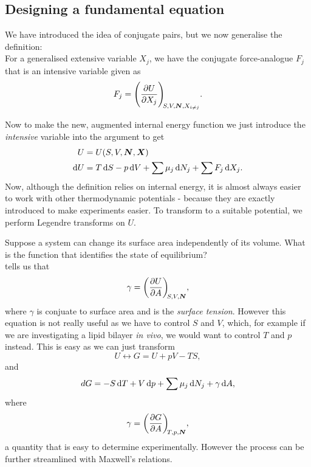 \subsection{Designing a fundamental equation}
\begin{defi}
We have introduced the idea of conjugate pairs, but we now generalise the definition:\\
For a generalised extensive variable $X_j$, we have the conjugate force-analogue $F_j$that is an intensive variable given as 
\begin{equation}
\label{conj_force}
F_j=\diffp{U}{X_j}[S,V,\bvec{N},X_{i\neq j}].
\end{equation}
\end{defi}
Now to make the new, augmented internal energy function we just introduce the \textit{intensive} variable into the argument to get 
\begin{subequations}
\begin{align}
U&=U(S,V,\bvec{N},\bvec{X})\\
\dif U&=T\dif S-p\dif V+\sum\mu_j\dif N_j+\sum F_j\dif X_j.
\end{align}
\end{subequations}
Now, although the definition relies on internal energy, it is almost always easier to work with other thermodynamic potentials - 
because they are exactly introduced to make experiments easier. To transform to a suitable potential, we perform Legendre transforms on $U$.
\begin{wex}
Suppose a system can change its surface area independently of its volume. What is the function that identifies the state of equilibrium? \\
 tells us that 
\begin{equation}
\gamma=\diffp{U}{A}[S,V,\bvec{N}],
\end{equation}
where $\gamma$ is conjuate to surface area and is the \textit{surface tension}. 
However this equation is not really useful as we have to control $S$ and $V$, 
which, for example if we are investigating a lipid bilayer \textit{in vivo}, 
we would want to control $T$ and $p$ instead. This is easy as we can just transform
\begin{equation}
U\leftrightarrow G=U+pV-TS,
\end{equation}
and 
\begin{equation}
dG=-S\dif T+V\dif p+\sum\mu_j\dif N_j+\gamma\dif A,
\end{equation}
where 
\begin{equation}
\gamma=\diffp GA[T,p,\bvec{N}], 
\end{equation}
a quantity that is easy to determine experimentally. However the process can be further streamlined with Maxwell's relations.
\end{wex}
